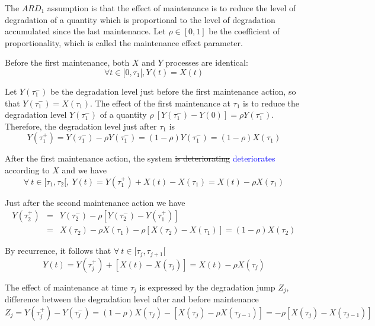 The $ARD_1$ assumption is that the effect of maintenance is to reduce the level of degradation of a quantity which is proportional to the level of degradation accumulated since the last maintenance. Let $\rho \in [0,1]$ be the coefficient of proportionality, which is called the maintenance effect parameter.

Before the first maintenance, both $X$ and $Y$ processes are identical:
$$\forall t\in [0,\tau_1[, Y(t)=X(t)$$

Let $Y(\tau_1^-)$ be the degradation level just before the first maintenance action, so that $Y(\tau_1^-)=X(\tau_1)$.
The effect of the first maintenance at $\tau_1$ is to reduce the degradation level $Y(\tau_1^-)$ of a quantity $\rho \ \left[ Y(\tau_1^-)- Y(0)\right]=\rho Y(\tau_1^-)$. Therefore, the degradation level just after $\tau_1$ is
\begin{equation}
Y(\tau_1^+)=Y(\tau_1^-)- \rho Y(\tau_1^-)=(1-\rho) Y(\tau_1^-)=(1-\rho) X(\tau_1)
\label{eq:Ytau1+}
\end{equation}

After the first maintenance action, the system \st{is deteriorating} \textcolor{blue}{deteriorates} according to $X$ and we have 
$$\forall\ t\in [\tau_1,\tau_2[,\ Y(t)=Y(\tau_1^+)+ X(t)-X(\tau_1)=X(t)-\rho X(\tau_1)$$

\noindent Just after the second maintenance action we have
\begin{eqnarray}
Y(\tau_2^+) &=& Y(\tau_2^-) - \rho [Y(\tau_2^-) - Y(\tau_1^+)] \label{eq:Ytau2+}\\
&=& X(\tau_2)-\rho X(\tau_1) - \rho [X(\tau_2)-X(\tau_1)] = (1-\rho) X(\tau_2) \nonumber
\end{eqnarray}

\noindent By recurrence, it follows that $\forall\ t \in [\tau_j,\tau_{j+1}[$ 
\begin{equation}
Y(t)=Y(\tau_{j}^+)+\left[ X(t)-X(\tau_j)\right]
=X(t)-\rho X(\tau_j)
\label{eq:Y(t)}
\end{equation}

\noindent The effect of maintenance at time $\tau_j$ is expressed by the degradation jump $Z_j$, difference between the degradation level after and before maintenance
\begin{equation}
Z_j = Y(\tau_{j}^+) - Y(\tau_{j}^-) = (1-\rho) X(\tau_j) - \left[ X(\tau_j) - \rho X(\tau_{j-1}) \right] = -\rho \left[X(\tau_{j})-X(\tau_{j-1})\right]
\label{eq:Z_j}
\end{equation}


